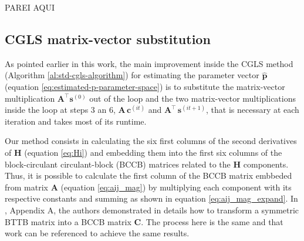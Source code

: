 PAREI AQUI

\subsection{CGLS matrix-vector substitution}

As pointed earlier in this work, the main improvement inside the CGLS method (Algorithm \ref{al:std-cgls-algorithm}) for estimating the parameter vector $\hat{\mathbf{p}}$ (equation \ref{eq:estimated-p-parameter-space}) is to substitute the matrix-vector multiplication $\mathbf{A}^{\top} \mathbf{s}^{(0)}$ out of the loop and the two matrix-vector multiplications inside the loop at steps 3 an 6, $\mathbf{A} \, \mathbf{c}^{(it)}$ and $\mathbf{A}^{\top} \, \mathbf{s}^{(it + 1)}$, that is necessary at each iteration and takes most of its runtime.

Our method consists in calculating the six first columns of the second derivatives of $\mathbf{H}$ (equation \ref{eq:Hi}) and embedding them into the first six columns of the block-circulant circulant-block (BCCB) matrices related to the $\mathbf{H}$ components. Thus, it is possible to calculate the first column of the BCCB matrix embbeded from matrix $\mathbf{A}$ (equation \ref{eq:aij_mag}) by multiplying each component with its respective constants and summing as shown in equation \ref{eq:aij_mag_expand}. In \cite{takahashi2020convolutional}, Appendix A, the authors demonstrated in details how to transform a symmetric BTTB matrix into a BCCB matrix $\mathbf{C}$. The process here is the same and that work can be referenced to achieve the same results.

